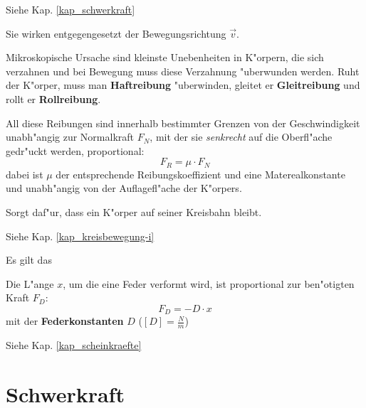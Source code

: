 \begin{description}[\setlabelstyle{\bfseries\slshape}]
\item[Gewichts-/Schwerkraft]  Siehe Kap. \ref{kap_schwerkraft}
\item[Reibunsgkr"afte] 
Sie wirken entgegengesetzt der Bewegungsrichtung $\Vec v$.

   Mikroskopische Ursache sind kleinste Unebenheiten in K"orpern, die
   sich verzahnen und bei Bewegung muss diese Verzahnung "uberwunden
   werden. Ruht der K"orper, muss man
   \textbf{Haftreibung} "uberwinden, gleitet er
   \textbf{Gleitreibung} und rollt er
   \textbf{Rollreibung}.

   All diese Reibungen sind innerhalb bestimmter Grenzen von der
   Geschwindigkeit unabh"angig zur Normalkraft $F_N$, mit der sie
   \emph{senkrecht} auf die Oberfl"ache gedr"uckt werden, proportional:
\begin{equation}
   \label{eqn_reibung}
   F_R = \mu \cdot F_N
\end{equation}
dabei ist $\mu$ der entsprechende Reibungskoeffizient und eine
Materealkonstante und unabh"angig von der Auflagefl"ache der K"orpers.
\item[Zentripetalkraft] Sorgt daf"ur, dass ein K"orper auf seiner
   Kreisbahn bleibt.

   Siehe Kap. \ref{kap_kreisbewegung-i}
\item[Federkraft] Es gilt das 
   \begin{Def}
\label{def_hook-sches-gesetz}
      Die L"ange $x$, um die eine Feder verformt wird, ist proportional
      zur ben"otigten Kraft $F_D$:
      \begin{equation}
         \label{eqn_hooksches-gesetz}
         F_D = - D \cdot x
      \end{equation}
      mit der \textbf{Federkonstanten} $D$ ($[D] = \frac{N}{m}$)
   \end{Def}
\item[Scheinkr"afte] Siehe Kap. \ref{kap_scheinkraefte}
\end{description}










\section{Schwerkraft}
\label{kap_schwerkraft}


